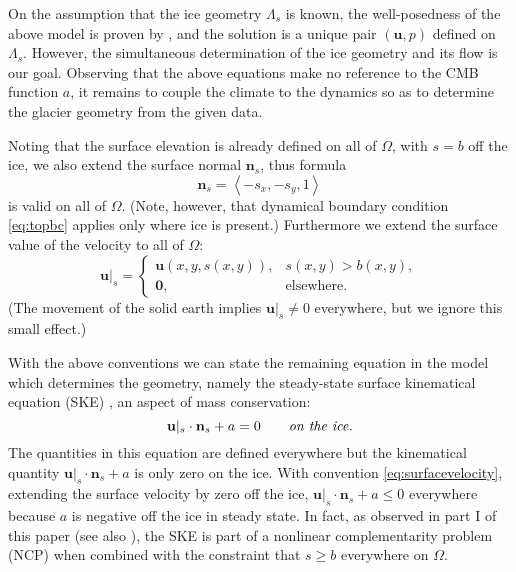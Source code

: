 \documentclass[letterpaper,final,12pt,reqno]{amsart}
\theoremstyle{claim}
\newcommand{\bn}{\mathbf{n}}
\newcommand{\bu}{\mathbf{u}}
\newcommand{\bzero}{\bm{0}}
\numberwithin{equation}{section}
\numberwithin{figure}{section}
\numberwithin{table}{section}
\numberwithin{theorem}{section}
\begin{document}
On the assumption that the ice geometry $\Lambda_s$ is known, the well-posedness of the above model is proven by \cite{JouvetRappaz2011}, and the solution is a unique pair $(\bu,p)$ defined on $\Lambda_s$.  However, the simultaneous determination of the ice geometry and its flow is our goal.  Observing that the above equations make no reference to the CMB function $a$, it remains to couple the climate to the dynamics so as to determine the glacier geometry from the given data.

Noting that the surface elevation is already defined on all of $\Omega$, with $s=b$ off the ice, we also extend the surface normal $\bn_s$, thus formula
\begin{equation}
\bn_s = \left<-s_x,-s_y,1\right> \label{eq:surfacenormal}
\end{equation}
is valid on all of $\Omega$.  (Note, however, that dynamical boundary condition \eqref{eq:topbc} applies only where ice is present.)  Furthermore we extend the surface value of the velocity to all of $\Omega$:
\newcommand{\us}{\bu|_s}
\begin{equation}
\bu|_s = \begin{cases} \bu(x,y,s(x,y)), & s(x,y) > b(x,y), \\
                       \bzero, & \text{elsewhere}. \end{cases} \label{eq:surfacevelocity}
\end{equation}
(The movement of the solid earth implies $\us\ne 0$ everywhere, but we ignore this small effect.)

With the above conventions we can state the remaining equation in the model which determines the geometry, namely the steady-state surface kinematical equation (SKE) \cite{GreveBlatter2009}, an aspect of mass conservation:
\begin{equation}
\bu|_s \cdot \bn_s + a = 0 \qquad \text{\emph{on the ice}}. \label{eq:ske}
\end{equation}
The quantities in this equation are defined everywhere but the kinematical quantity $\bu|_s \cdot \bn_s + a$ is only zero on the ice.  With convention \eqref{eq:surfacevelocity}, extending the surface velocity by zero off the ice, $\bu|_s \cdot \bn_s + a \le 0$ everywhere because $a$ is negative off the ice in steady state.  In fact, as observed in part I of this paper \cite{Bueler2022partI} (see also \cite{Bueler2021conservation}), the SKE is part of a nonlinear complementarity problem (NCP) when combined with the constraint that $s\ge b$ everywhere on $\Omega$.
\end{document}
